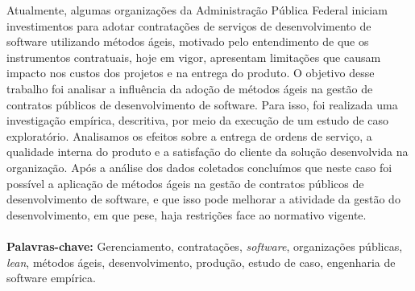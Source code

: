 \begin{resumo}
Atualmente, algumas organizações da Administração Pública Federal iniciam investimentos para adotar contratações de serviços de desenvolvimento de software utilizando métodos ágeis, motivado pelo entendimento de que os instrumentos contratuais, hoje em vigor, apresentam limitações que causam impacto nos custos dos projetos e na entrega do produto. O objetivo desse trabalho foi analisar a influência da adoção de métodos ágeis na gestão de contratos públicos de desenvolvimento de software. Para isso, foi realizada uma investigação empírica, descritiva, por meio da execução de um estudo de caso exploratório. Analisamos os efeitos sobre a entrega de ordens de serviço, a qualidade interna do produto e a satisfação do cliente da solução desenvolvida na organização. Após a análise dos dados coletados concluímos que neste caso foi possível a aplicação de métodos ágeis na gestão de contratos públicos de desenvolvimento de software, e que isso pode melhorar a atividade da gestão do desenvolvimento, em que pese, haja restrições face ao normativo vigente.
{
\\
\\
\textbf{Palavras-chave:} Gerenciamento, contratações, \textit{software}, organizações públicas, \textit{lean}, métodos ágeis, desenvolvimento, produção, estudo de caso, engenharia de software empírica.}
\end{resumo}

